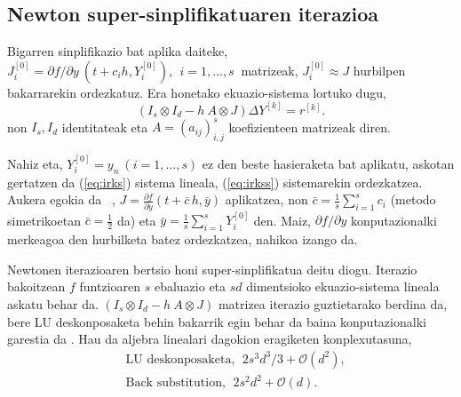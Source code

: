 
\subsection*{Newton super-sinplifikatuaren iterazioa}

Bigarren sinplifikazio bat aplika daiteke, $J_i^{[0]}=\partial f / \partial y \ (t+c_ih, Y_i^{[0]}), \ \  i=1,\dots,s \ $ matrizeak,  $J_i^{[0]} \approx J$ hurbilpen bakarrarekin ordezkatuz. Era honetako ekuazio-sistema lortuko dugu, 
\begin{equation}
\label{eq:irkss}
(I_s \otimes I_d - h \ A \otimes J) \Delta Y^{[k]} = r^{[k]}.
\end{equation}
non $I_s,I_d$ identitateak eta $A=(a_{ij})_{i,j}^s$ koefizienteen matrizeak diren.

Nahiz eta, $Y_i^{[0]}=y_n \ (i=1,\dots,s)$  ez den beste hasieraketa bat aplikatu, askotan gertatzen da (\ref{eq:irks}) sistema lineala, (\ref{eq:irkss}) sistemarekin ordezkatzea. Aukera egokia da ~\cite{Xie2009},  $J=  \frac{\partial f}{\partial y}(t+\bar c \, h,\bar y)$ aplikatzea, non $\bar c = \frac{1}{s} \sum_{i=1}^{s}c_i$ (metodo simetrikoetan $\bar c = \frac12$ da)  eta  $\bar y =  \frac{1}{s} \sum_{i=1}^{s}Y_i^{[0]}$ den. Maiz, $\partial f/\partial y$  konputazionalki merkeagoa den hurbilketa batez ordezkatzea, nahikoa izango da.      

Newtonen iterazioaren bertsio honi super-sinplifikatua deitu diogu. Iterazio bakoitzean $f$ funtzioaren $s$ ebaluazio eta $sd$ dimentsioko ekuazio-sistema lineala askatu behar da. $(I_s \otimes I_d - h \ A \otimes J)$ matrizea iterazio guztietarako berdina da,  bere LU deskonposaketa behin bakarrik egin behar da baina konputazionalki garestia da \cite{Butcher1976,Hairer1996}. Hau da aljebra linealari dagokion eragiketen konplexutasuna,
\begin{align*}
&\text{LU deskonposaketa}, \ \ 2s^3d^3/3+\mathcal{O}(d^2), \\
&\text{Back substitution}, \ \ 2s^2d^2+\mathcal{O}(d).
\end{align*}


